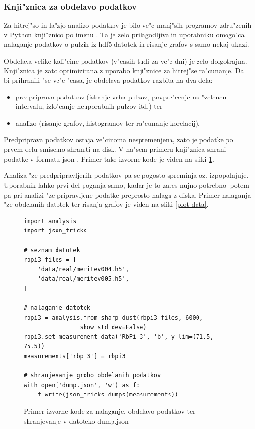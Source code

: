 \documentclass[11pt,a4paper]{article}
\begin{document}
\subsubsection{Knji"znica za obdelavo podatkov}
Za hitrej"so in la"zjo analizo podatkov je bilo ve"c manj"sih programov zdru"zenih v Python knji"znico po imenu . Ta je zelo prilagodljiva in uporabniku omogo"ca nalaganje podatkov o pulzih iz hdf5 \cite{hdf5} datotek in risanje grafov s samo nekaj ukazi.

Obdelava velike koli"cine podatkov (v"casih tudi za ve"c dni) je zelo dolgotrajna. Knji"znica  je zato optimizirana z uporabo knji"znice  za hitrej"se ra"cunanje. Da bi prihranili "se ve"c "casa, je obdelava podatkov razbita na dva dela:
\begin{itemize}
	\item predpripravo podatkov (iskanje vrha pulzov, povpre"cenje na "zelenem intervalu, izlo"canje neuporabnih pulzov itd.) ter
	\item analizo (risanje grafov, histogramov ter ra"cunanje korelacij).
\end{itemize}

Predpriprava podatkov ostaja ve"cinoma nespremenjena, zato je podatke po prvem delu smiselno shraniti na disk. V na"sem primeru knji"znica shrani podatke v formatu json \cite{json}. Primer take izvorne kode je viden na sliki \ref{dump-data}.

Analiza "ze predpripravljenih podatkov pa se pogosto spreminja oz. izpopolnjuje. Uporabnik lahko prvi del poganja samo, kadar je to zares nujno potrebno, potem pa pri analizi "ze pripravljene podatke preprosto nalaga z diska. Primer nalaganja "ze obdelanih datotek ter risanja grafov je viden na sliki \ref{plot-data}.

\begin{figure}[H]
	\begin{lstlisting}[frame=single]
import analysis
import json_tricks

# seznam datotek
rbpi3_files = [
	'data/real/meritev004.h5',
	'data/real/meritev005.h5',
]

# nalaganje datotek
rbpi3 = analysis.from_sharp_dust(rbpi3_files, 6000,
				show_std_dev=False)
rbpi3.set_measurement_data('RbPi 3', 'b', y_lim=(71.5, 75.5))
measurements['rbpi3'] = rbpi3

# shranjevanje grobo obdelanih podatkov
with open('dump.json', 'w') as f:
	f.write(json_tricks.dumps(measurements))
	\end{lstlisting}
	\caption{Primer izvorne kode za nalaganje, obdelavo podatkov ter shranjevanje v datoteko dump.json}
	\label{dump-data}
\end{figure}
\end{document}
